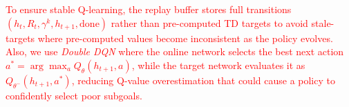 \documentclass[letterpaper, 10 pt, conference]{ieeeconf}
\begin{document}
\textcolor{red}{To ensure stable Q-learning, the replay buffer stores full transitions $(h_t, R_t, \gamma^k, h_{t+1}, \text{done})$ rather than pre-computed TD targets to avoid stale-targets where pre-computed values become inconsistent as the policy evolves. Also, we use \emph{Double DQN} \cite{10.5555/3016100.3016191} where the online network selects the best next action $a^* = \arg\max_a Q_\theta(h_{t+1}, a)$, while the target network evaluates it as $Q_{\theta^-}(h_{t+1}, a^*)$, reducing Q-value overestimation that could cause a policy to confidently select poor subgoals.}



\end{document}
